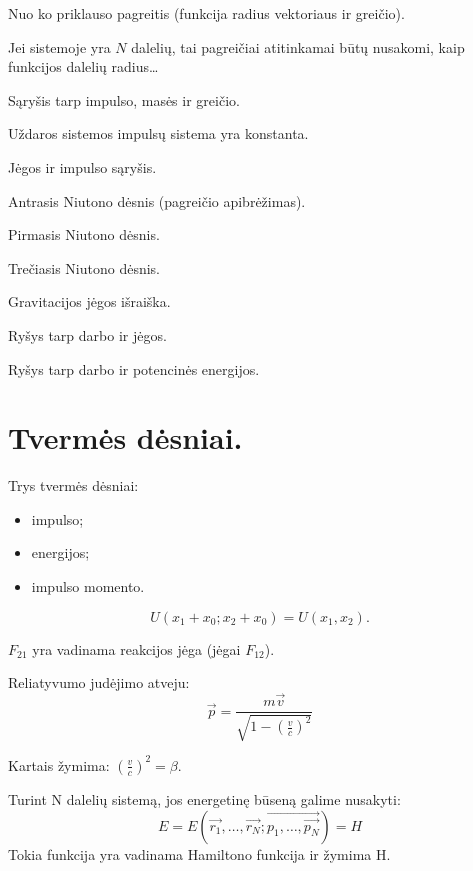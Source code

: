 \begin{remember}
  \item Nuo ko priklauso pagreitis (funkcija radius vektoriaus ir greičio).
  \item Jei sistemoje yra $N$ dalelių, tai pagreičiai atitinkamai būtų
    nusakomi, kaip funkcijos dalelių radius…
  \item Sąryšis tarp impulso, masės ir greičio.
  \item Uždaros sistemos impulsų sistema yra konstanta.
  \item Jėgos ir impulso sąryšis.
  \item Antrasis Niutono dėsnis (pagreičio apibrėžimas).
  \item Pirmasis Niutono dėsnis.
  \item Trečiasis Niutono dėsnis.
  \item Gravitacijos jėgos išraiška.
  \item Ryšys tarp darbo ir jėgos.
  \item Ryšys tarp darbo ir potencinės energijos.
\end{remember}

\section{Tvermės dėsniai.}

Trys tvermės dėsniai:
\begin{itemize}
  \item impulso;
  \item energijos;
  \item impulso momento.
\end{itemize}

\begin{equation*}
  U(x_{1} + x_{0}; x_{2}+x_{0}) = U(x_{1},x_{2}).
\end{equation*}

$F_{21}$ yra vadinama reakcijos jėga (jėgai $F_{12}$).

Reliatyvumo judėjimo atveju:
\begin{equation*}
  \vec{p} = \frac{m\vec{v}}{\sqrt{1 - (\frac{v}{c})^{2}}}
\end{equation*}

\begin{note}
  Kartais žymima: $\left( \frac{v}{c} \right)^{2} = \beta$.
\end{note}

Turint N dalelių sistemą, jos energetinę būseną galime nusakyti:
\begin{equation*}
  E = E(\vec{r_{1}},\ldots,\vec{r_{N}}; \vec{p_{1},\ldots,\vec{p_{N}}}) = H
\end{equation*}
Tokia funkcija yra vadinama Hamiltono funkcija ir žymima H.

